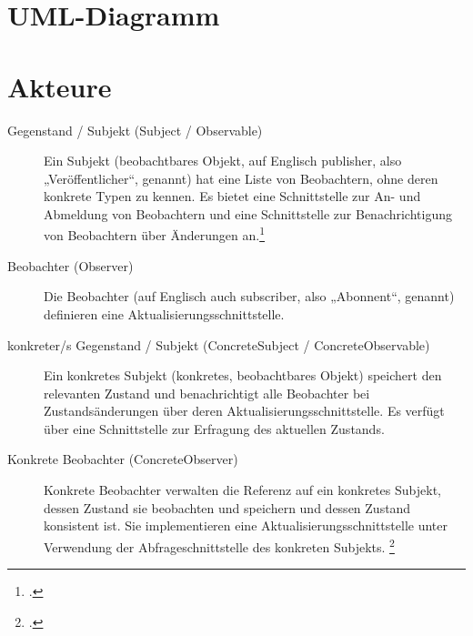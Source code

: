 \documentclass{lehramt-informatik}
\begin{document}
%

\section{UML-Diagramm}


%

\section{Akteure}

\begin{description}
\item[Gegenstand / Subjekt (Subject / Observable)]

Ein Subjekt (beobachtbares Objekt, auf Englisch publisher, also
„Veröffentlicher“, genannt) hat eine Liste von Beobachtern, ohne deren
konkrete Typen zu kennen. Es bietet eine Schnittstelle zur An- und
Abmeldung von Beobachtern und eine Schnittstelle zur Benachrichtigung
von Beobachtern über Änderungen an.\footcite[Seite 251]{gof}

\item[Beobachter (Observer)]
Die Beobachter (auf Englisch auch subscriber, also „Abonnent“, genannt)
definieren eine Aktualisierungsschnittstelle.

\item[konkreter/s Gegenstand / Subjekt (ConcreteSubject / ConcreteObservable)]

Ein konkretes Subjekt (konkretes, beobachtbares Objekt) speichert den
relevanten Zustand und benachrichtigt alle Beobachter bei
Zustandsänderungen über deren Aktualisierungsschnittstelle. Es verfügt
über eine Schnittstelle zur Erfragung des aktuellen Zustands.

\item[Konkrete Beobachter (ConcreteObserver)]

Konkrete Beobachter verwalten die Referenz auf ein konkretes Subjekt,
dessen Zustand sie beobachten und speichern und dessen Zustand
konsistent ist. Sie implementieren eine Aktualisierungsschnittstelle
unter Verwendung der Abfrageschnittstelle des konkreten Subjekts.
\footcite{wiki:beobachter}
\end{description}
\end{document}

